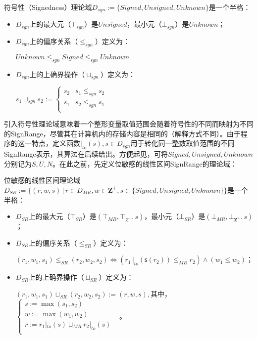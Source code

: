 \begin{definition}
	符号性（Signedness）理论域$ D_{sgn} := \{Signed, Unsigned, Unknown\} $是一个半格：
	\begin{itemize}
		\item $ D_{sgn} $上的最大元（$ \top_{sgn} $）是$ Unsigned $，最小元（$ \bot_{sgn} $）是$ Unknown $；
		
		\item $ D_{sgn} $上的偏序关系（$ \le_{sgn} $）定义为：\\
			\centerline{$ Unknown \le_{sgn} Signed \le_{sgn} Unknown $}
			
		\item $ D_{sgn} $上的上确界操作（$ \sqcup_{sgn} $）定义为：\\
			\centerline{$ s_1 \sqcup_{sgn} s_2 := \begin{cases}
				s_2 & s_1 \le_{sgn} s_2\\
				s_1 & s_2 \le_{sgn} s_1\\
				\end{cases} $}
	\end{itemize}
\end{definition}

引入符号性理论域意味着一个整形变量取值范围会随着符号性的不同而映射为不同的SignRange，尽管其在计算机内的存储内容是相同的（解释方式不同）。由于程序的这一特点，定义函数$ |_{to}(s), s \in D_{sgn} $用于转化同一整数取值范围的不同SignRange表示，其算法在后续给出。方便起见，可将$ Signed, Unsigned, Unknown $分别记为$ S, U, N $。在此之前，先定义位敏感的线性区间SignRange的理论域：

\begin{definition}
	位敏感的线性区间理论域	$ D_{SR} := \{(r, w,  s) \, | \,  r \in D_{MR}, w \in \mathbf{Z^+}, s \in \{Signed, Unsigned, Unknown\}\} $是一个半格：
	\begin{itemize}
		\item $ D_{SR} $上的最大元（$ \top_{SR} $）是$ (\top_{MR}, \top_{Z^+}, s) $，最小元（$ \bot_{SR} $）是$ (\bot_{MR}, \bot_{\mathbf{Z}^+}, s)$；
		
		\item $ D_{SR} $上的偏序关系（$ \le_{SR} $）定义为：\\
			\centerline{$ (r_1, w_1, s_1) \le_{SR} (r_2, w_2, s_2) \iff (r_1 \,  |_{to}(\mathsf{s}(r_2)) \le_{MR} r_2) \land (w_1 \le w_2) $；}
			
		\item $ D_{SR} $上的上确界操作（$ \sqcup_{SR} $）定义为：\\
			\centerline{$ (r_1, w_1, s_1) \sqcup_{SR} (r_2, w_2, s_2)  :=  (r, w, s) , $其中，$ \begin{cases}
				s := \max(s_1, s_2)&\\
				w := \max(w_1, w_2)&\\
				r := r_1 |_{to}(s) \sqcup_{MR} r_2 |_{to}(s)&\\
				\end{cases}$。}
	\end{itemize}
\end{definition}

